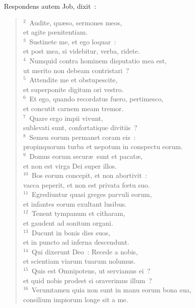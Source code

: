 \lettrine[lines=3,image=true,loversize=0.05,lraise=-0.03]{R}{}espondens autem Job, dixit~:
\begin{flushleft}\begin{verse}\vspace{6pt}${}^{2}$~Audite, qu\ae so, sermones meos,\\ et agite pœnitentiam.\\
${}^{3}$~Sustinete me, et ego loquar~:\\ et post mea, si videbitur, verba, ridete.\\
${}^{4}$~Numquid contra hominem disputatio mea est,\\ ut merito non debeam contristari~?\\
${}^{5}$~Attendite me et obstupescite,\\ et superponite digitum ori vestro.\\
${}^{6}$~Et ego, quando recordatus fuero, pertimesco,\\ et concutit carnem meam tremor.\\
${}^{7}$~Quare ergo impii vivunt,\\ sublevati sunt, confortatique divitiis~?\\
${}^{8}$~Semen eorum permanet coram eis~:\\ propinquorum turba et nepotum in conspectu eorum.\\
${}^{9}$~Domus eorum secur\ae\ sunt et pacat\ae ,\\ et non est virga Dei super illos.\\
${}^{10}$~Bos eorum concepit, et non abortivit~:\\ vacca peperit, et non est privata fœtu suo.\\
${}^{11}$~Egrediuntur quasi greges parvuli eorum,\\ et infantes eorum exultant lusibus.\\
${}^{12}$~Tenent tympanum et citharam,\\ et gaudent ad sonitum organi.\\
${}^{13}$~Ducunt in bonis dies suos,\\ et in puncto ad inferna descendunt.\\
${}^{14}$~Qui dixerunt Deo~: Recede a nobis,\\ et scientiam viarum tuarum nolumus.\\
${}^{15}$~Quis est Omnipotens, ut serviamus ei~?\\ et quid nobis prodest si oraverimus illum~?\\
${}^{16}$~Verumtamen quia non sunt in manu eorum bona sua,\\ consilium impiorum longe sit a me.\\

\end{verse}
\end{flushleft}
